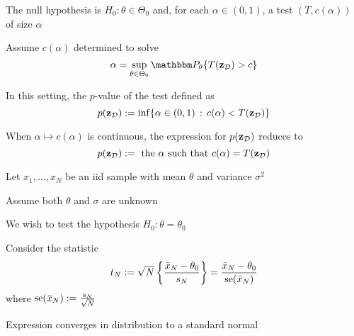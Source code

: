 \begin{frame}

    \vspace{2em}
    The null hypothesis is $H_0 :
    \theta \in \Theta_0$ and, for each $\alpha \in (0,1)$, a test $(T,c(\alpha))$
    of size $\alpha$
    
    Assume $c(\alpha)$ determined to solve 
    \begin{equation*}
        \alpha = \sup_{\theta \in \Theta_0} \PP_{\theta}\{T(\zdata) > c\}
    \end{equation*}
    
    In this setting, the $p$-value of the test defined as
    \begin{equation*}
        p(\mathbf{z}_{\mathcal D}) := \inf \{ \alpha \in (0,1) \,  : \, c(\alpha) <
        T(\mathbf{z}_{\mathcal D})  \}
    \end{equation*}
    
    \vspace{.7em}
    When $\alpha \mapsto c(\alpha)$ is continuous, the expression for $p(\mathbf{z}_{\mathcal D})$ 
    reduces to 
    \begin{equation*}
        \label{eq:edp}
        p(\mathbf{z}_{\mathcal D}) := \text{ the } \alpha \text{ such that } c(\alpha) =
        T(\mathbf{z}_{\mathcal D}) 
    \end{equation*}
    
\end{frame}

\begin{frame}

    \vspace{2em}
    \Eg
    Let $x_1,\ldots,x_N$ be an {\sc iid} sample with mean $\theta$ and variance
    $\sigma^2$
    
    Assume both $\theta$ and $\sigma$ are unknown
    
    We wish to test the hypothesis $H_0 \colon \theta =
    \theta_0$
    
    \vspace{.7em}
    Consider the statistic 
    \begin{equation*}
        \label{eq:easn2}
        t_N 
        := \sqrt{N} \left\{ \frac{\bar x_N - \theta_0}{s_N}  \right\}
        =  \frac{\bar x_N - \theta_0}{\operatorname{se}(\bar x_N)}
    \end{equation*}
    where $\operatorname{se}(\bar x_N) := \frac{s_N}{\sqrt{N}}$
    
    Expression converges in
    distribution to a standard normal
    
\end{frame}

